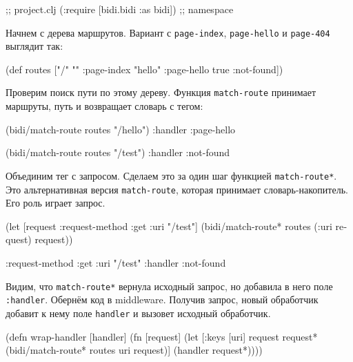 \begin{english}
  \begin{clojure}
[bidi "2.1.5"]                  ;; project.clj
(:require [bidi.bidi :as bidi]) ;; namespace
  \end{clojure}
\end{english}

Начнем с дерева маршрутов. Вариант с \verb|page-index|, \verb|page-hello| и
\verb|page-404| выглядит так:

\begin{english}
  \begin{clojure}
(def routes
  ["/" {""      :page-index
        "hello" :page-hello
        true    :not-found}])
  \end{clojure}
\end{english}


Проверим поиск пути по этому дереву. Функция \verb|match-route| принимает
маршруты, путь и возвращает словарь с тегом:

\begin{english}
  \begin{clojure}
(bidi/match-route routes "/hello")
{:handler :page-hello}

(bidi/match-route routes "/test")
{:handler :not-found}
  \end{clojure}
\end{english}


Объединим тег с запросом. Сделаем это за один шаг функцией
\verb|match-route*|. Это альтернативная версия \verb|match-route|, которая
принимает словарь-накопитель. Его роль играет запрос.

\begin{english}
  \begin{clojure}
(let [request {:request-method :get
               :uri "/test"}]
  (bidi/match-route* routes (:uri request) request))

{:request-method :get
 :uri "/test"
 :handler :not-found}
  \end{clojure}
\end{english}

Видим, что \verb|match-route*| вернула исходный запрос, но добавила в него
поле \verb|:handler|. Обернём код в middleware. Получив запрос, новый
обработчик добавит к нему поле \verb|handler| и вызовет исходный обработчик.

\begin{english}
  \begin{clojure}
(defn wrap-handler [handler]
  (fn [request]
    (let [{:keys [uri]} request
          request* (bidi/match-route* routes uri request)]
      (handler request*))))
  \end{clojure}
\end{english}

